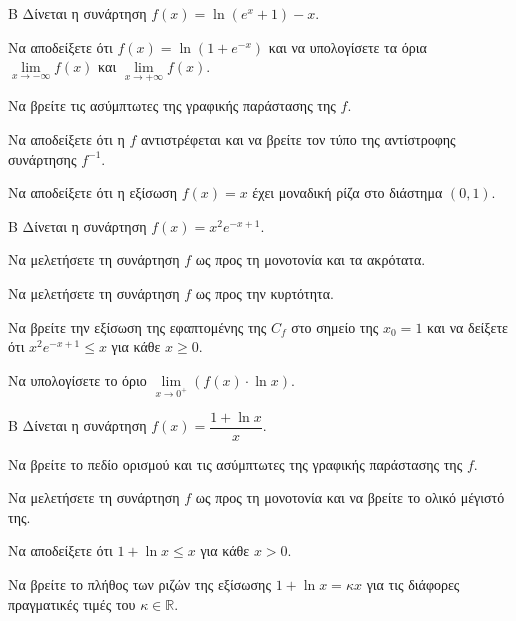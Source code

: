 \begin{thema}{Β}
Δίνεται η συνάρτηση $f(x) = \ln(e^x + 1) - x$.
\begin{erwthma}
\item Να αποδείξετε ότι $f(x) = \ln(1 + e^{-x})$ και να υπολογίσετε τα όρια $\lim\limits_{x \to -\infty} f(x)$ και $\lim\limits_{x \to +\infty} f(x)$.
\item Να βρείτε τις ασύμπτωτες της γραφικής παράστασης της $f$.
\item Να αποδείξετε ότι η $f$ αντιστρέφεται και να βρείτε τον τύπο της αντίστροφης συνάρτησης $f^{-1}$.
\item Να αποδείξετε ότι η εξίσωση $f(x) = x$ έχει μοναδική ρίζα στο διάστημα $(0, 1)$.
\end{erwthma}
\end{thema}

\begin{thema}{Β}
Δίνεται η συνάρτηση $f(x) = x^2e^{-x+1}$.
\begin{erwthma}
\item Να μελετήσετε τη συνάρτηση $f$ ως προς τη μονοτονία και τα ακρότατα.
\item Να μελετήσετε τη συνάρτηση $f$ ως προς την κυρτότητα.
\item Να βρείτε την εξίσωση της εφαπτομένης της $C_f$ στο σημείο της $x_0 = 1$ και να δείξετε ότι $x^2e^{-x+1} \le x$ για κάθε $x \ge 0$.
\item Να υπολογίσετε το όριο $\lim\limits_{x \to 0^+} (f(x) \cdot \ln x)$.
\end{erwthma}
\end{thema}

\begin{thema}{Β}
Δίνεται η συνάρτηση $f(x) = \dfrac{1+\ln x}{x}$.
\begin{erwthma}
\item Να βρείτε το πεδίο ορισμού και τις ασύμπτωτες της γραφικής παράστασης της $f$.
\item Να μελετήσετε τη συνάρτηση $f$ ως προς τη μονοτονία και να βρείτε το ολικό μέγιστό της.
\item Να αποδείξετε ότι $1+\ln x \le x$ για κάθε $x > 0$.
\item Να βρείτε το πλήθος των ριζών της εξίσωσης $1 + \ln x = \kappa x$ για τις διάφορες πραγματικές τιμές του $\kappa \in \mathbb{R}$.
\end{erwthma}
\end{thema}

